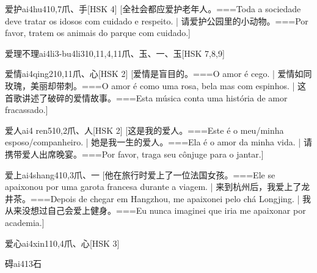 \begin{EntryWithPhonetic}{爱护}{ai4hu4}{10,7}{⽖、⼿}[HSK 4]
  [全社会都应爱护老年人。===Toda a sociedade deve tratar os idosos com cuidado e respeito. | 请爱护公园里的小动物。===Por favor, tratem os animais do parque com cuidado.]
\end{EntryWithPhonetic}

\begin{EntryWithPhonetic}{爱理不理}{ai4li3-bu4li3}{10,11,4,11}{⽖、⽟、⼀、⽟}[HSK 7,8,9]
\end{EntryWithPhonetic}

\begin{EntryWithPhonetic}{爱情}{ai4qing2}{10,11}{⽖、⼼}[HSK 2]
  [爱情是盲目的。===O amor é cego. | 爱情如同玫瑰，美丽却带刺。===O amor é como uma rosa, bela mas com espinhos.  | 这首歌讲述了破碎的爱情故事。===Esta música conta uma história de amor fracassado.]
\end{EntryWithPhonetic}

\begin{EntryWithPhonetic}{爱人}{ai4 ren5}{10,2}{⽖、⼈}[HSK 2]
  [这是我的爱人。===Este é o meu/minha esposo/companheiro. | 她是我一生的爱人。===Ela é o amor da minha vida. | 请携带爱人出席晚宴。===Por favor, traga seu cônjuge para o jantar.]
\end{EntryWithPhonetic}

\begin{EntryWithPhonetic}{爱上}{ai4shang4}{10,3}{⽖、⼀}
  [他在旅行时爱上了一位法国女孩。===Ele se apaixonou por uma garota francesa durante a viagem.  | 来到杭州后，我爱上了龙井茶。===Depois de chegar em Hangzhou, me apaixonei pelo chá Longjing. | 我从来没想过自己会爱上健身。===Eu nunca imaginei que iria me apaixonar por academia.]
\end{EntryWithPhonetic}

\begin{EntryWithPhonetic}{爱心}{ai4xin1}{10,4}{⽖、⼼}[HSK 3]
\end{EntryWithPhonetic}

\begin{EntryWithPhonetic}{碍}{ai4}{13}{⽯}
\end{EntryWithPhonetic}

